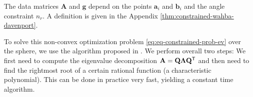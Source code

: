 The data matrices $\mathbf{A}$ and $\mathbf{g}$ depend on the points $\mathbf{a}_i$ and $\mathbf{b}_i$ and the angle constraint $n_r$. A definition is given in the Appendix \ref{thm:constrained-wahba-davenport}.

To solve this non-convex optimization problem \ref{eq:eq-constrained-prob-ev} over the sphere, we use the algorithm proposed in \cite{10.1007/978-3-642-75536-1_57}. We perform overall two steps: We first need to compute the eigenvalue decomposition  $\mathbf{A} = \mathbf{Q}\mathbf{\Lambda}\mathbf{Q}^{\mathsf{T}}$ and then need to find the rightmost root of a certain rational function (a characteristic polynomial). This can be done in practice very fast, yielding a constant time algorithm.
